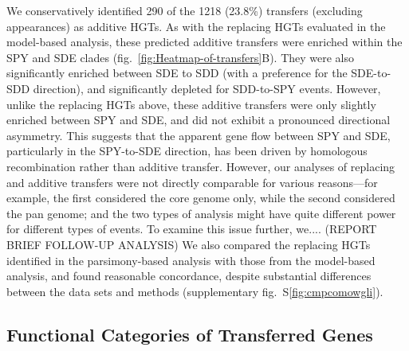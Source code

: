 \documentclass[12pt]{article}
\begin{document}



We conservatively identified 290 of the 1218 (23.8\%) transfers (excluding
appearances) as additive HGTs. 
As with the replacing HGTs evaluated in the model-based analysis, these
predicted additive transfers were enriched within the SPY and SDE clades 
(fig.\ \ref{fig:Heatmap-of-transfers}B).  
They were also significantly enriched between
SDE to SDD (with a preference for the SDE-to-SDD direction), and
significantly depleted for SDD-to-SPY events.
However, unlike the replacing HGTs above, these additive transfers were only
slightly enriched between SPY and SDE, and did not exhibit a pronounced
directional asymmetry.  This suggests that the apparent
gene flow between SPY and SDE, particularly in the SPY-to-SDE
direction, has been driven by homologous recombination rather than additive
transfer.  However, our analyses of replacing and
additive transfers were not directly comparable for various reasons---for
example, the first considered the core genome only, while the second
considered the pan genome; and the two types of analysis might have quite
different power for different types of events.
To examine this issue further, we.... (REPORT BRIEF FOLLOW-UP ANALYSIS)
We also compared the replacing HGTs identified in the parsimony-based
analysis with those from the model-based analysis, and found reasonable
concordance, despite substantial
differences between the data sets and methods 
(supplementary fig.\ S\ref{fig:cmpcomowgli}).

\subsection*{Functional Categories of Transferred Genes}
\end{document}
